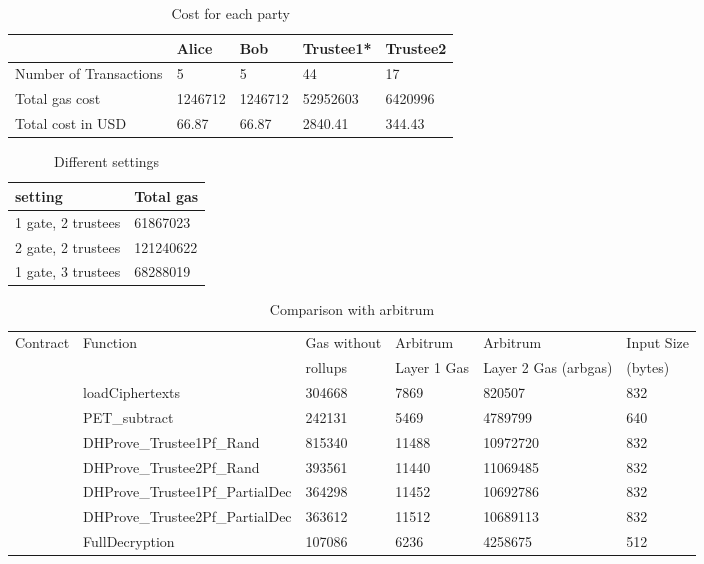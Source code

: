 \begin{table}[]
	\begin{tabular}{|l|l|l|l|l|}
		\hline
		& Alice &  Bob & Trustee1*  & Trustee2  \\ \hline
		Number of Transactions	& 5 &5  &44  &17  \\ \hline
		Total gas cost	& 1246712 &  1246712& 52952603  & 6420996 \\ \hline
		Total cost in USD	&  66.87& 66.87 &2840.41  & 344.43 \\ \hline
	\end{tabular}
	\caption{Cost for each party} 
\end{table}

\begin{table}[]
	\begin{tabular}{|l|l|}
	\hline
	setting	& Total gas  \\ \hline
	1 gate, 2 trustees	& 61867023  \\ \hline
	2 gate, 2 trustees	&  121240622 \\ \hline
	1 gate, 3 trustees	& 68288019 \\ \hline
\end{tabular}
	\caption{Different settings}
\end{table}

\begin{table}[]
	\begin{tabular}{|l|l|l|l|l|l|}
		\hline
		Contract & Function  & Gas without  & Arbitrum  & Arbitrum & Input Size \\ 
		 &   &  rollups &  Layer 1 Gas &Layer 2 Gas (arbgas)& (bytes) \\ \hline
		\multirow{8}{*}{} 
		&  loadCiphertexts & 304668 & 7869 & 820507& 832\\  \cline{2-6}
		& PET\_subtract & 242131 & 5469& 4789799& 640\\  \cline{2-6}
		&  DHProve\_Trustee1Pf\_Rand& 815340 &  11488& 10972720& 832\\  \cline{2-6}
		PET.sol	&  DHProve\_Trustee2Pf\_Rand& 393561 &11440& 11069485 & 832 \\  \cline{2-6}
		&  DHProve\_Trustee1Pf\_PartialDec& 364298 & 11452& 10692786& 832\\  \cline{2-6}
		& DHProve\_Trustee2Pf\_PartialDec & 363612 & 11512& 10689113& 832\\  \cline{2-6}
		& FullDecryption  &  107086& 6236& 4258675 & 512\\  \hline
	\end{tabular}
	\caption{Comparison with arbitrum} 
\end{table}

